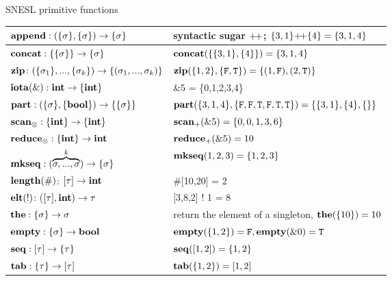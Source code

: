 \documentclass{beamer}
\begin{document}
\begin{frame}[fragile]{SNESL primitive functions}
	\begin{table}\footnotesize 
		\begin{tabular}{p{}|p{}}
			\hline
			$\mathbf{append : (\{\sigma\}, \{\sigma\}) \rightarrow \{\sigma\}}$ &  syntactic sugar ${\++}$; $\{3,1\} {\++} \{4\} = \{3,1,4\}$ \\ \hline
			$\mathbf{concat: \{\{\sigma\}\} \rightarrow \{\sigma\} }$ &  $\mathbf{concat}(\{\{3,1\},\{4\}\}) = \{3,1,4\}$                \\ \hline
			$\mathbf{zip} \colon (\{\sigma_1\}, ..., \{\sigma_k\})\rightarrow \{(\sigma_1,...,\sigma_k)\}$ & $\mathbf{zip}(\{1,2\},\{\mathtt{F},\mathtt{T}\}) = \{(1,\mathtt{F}),(2,\mathtt{T})\}$\\ \hline
			$\mathbf{iota(\&): \mathbf{int} \rightarrow \{\mathbf{int}\}}$  &  \&5 = \{0,1,2,3,4\} \\ \hline
			$\mathbf{part: (\{\sigma\}, \{\mathbf{bool}\}) \rightarrow  \{\{\sigma\}\}}$   & $\mathbf{part}(\{3,1,4\}, \{\mathtt{F},\mathtt{F},\mathtt{T},\mathtt{F},\mathtt{T},\mathtt{T}\}) = \{\{3,1\},\{4\},\{\}\}$                \\ \hline
			$\mathbf{scan_\otimes}: \{\mathbf{int}\} \rightarrow \{\mathbf{int}\}$     & $\mathbf{scan_+}(\&5) = \{0,0,1,3,6\} $  \\ \hline
			$\mathbf{reduce_\otimes: \{\mathbf{int}\} \rightarrow \mathbf{int} }$     &  $\mathbf{reduce_+}(\&5) = 10$              \\ \hline
			$\mathbf{mkseq}: (\overbrace{\sigma,...,\sigma}^{k}) \rightarrow \{\sigma\}$  & $\mathbf{mkseq}(1,2,3) = \{1,2,3\}$ \\ \hline  
			$\mathbf{length(\#)}$: $[\tau] \rightarrow \mathbf{int}$ & \#[10,20] = 2\\ \hline  
			$\mathbf{elt(!)}$: ($[\tau], \mathbf{int}) \rightarrow \tau$  & [3,8,2] ! 1 = 8 \\ \hline  
			$\mathbf{the:  \{\sigma\} \rightarrow \sigma}$     &  return the element of a singleton,  $\mathbf{the}(\{10\}) = 10$        \\ \hline
			$\mathbf{empty:  \{\sigma\} \rightarrow \mathbf{bool}}$       & $\mathbf{empty}(\{1,2\}) = \mathtt{F}, \mathbf{empty}(\&0)= \mathtt{T}$      \\ \hline  
			$\mathbf{seq}: [\tau] \rightarrow \{\tau\} $  & $\mathbf{seq}([1,2]) = \{1,2\}$ \\ \hline  
			$\mathbf{tab}: \{\tau\} \rightarrow [\tau] $  & $\mathbf{tab}(\{1,2\}) = [1,2]$\\ \hline  
		\end{tabular}
	\end{table}
	
\end{frame}
\end{document}
